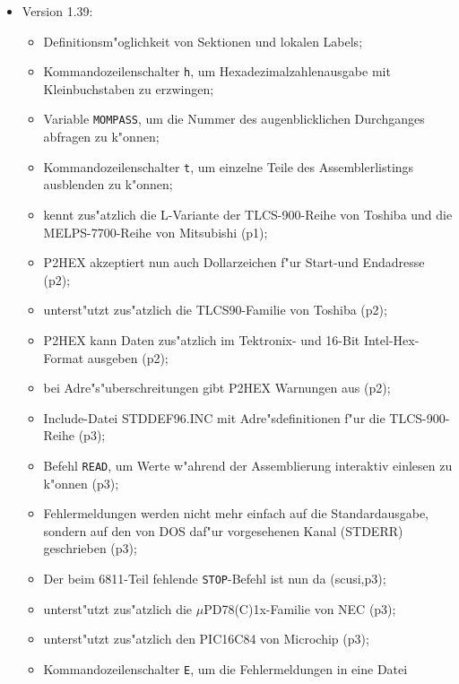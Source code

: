 \documentclass[12pt,a4paper,twoside]{report}
\newcommand{\tty}[1]{{\tt #1}}
\begin{document}
{\begin{itemize}
{\begin{itemize}
      \item{Der 8048-Codegenerator kennt nun auch die 8041/42-
            Befehlserweiterungen(p2);}
      \item{unterst"utzt zus"atzlich die Zilog Z8-Mikrokontroller(p3).}
      \end{itemize}}
\item{Version 1.39:
      \begin{itemize}
      \item{Definitionsm"oglichkeit von Sektionen und lokalen Labels;}
      \item{Kommandozeilenschalter \tty{h}, um Hexadezimalzahlenausgabe mit
            Kleinbuchstaben zu erzwingen;}
      \item{Variable \tty{MOMPASS}, um die Nummer des augenblicklichen Durchganges
            abfragen zu k"onnen;}
      \item{Kommandozeilenschalter \tty{t}, um einzelne Teile des Assemblerlistings
            ausblenden zu k"onnen;}
      \item{kennt zus"atzlich die L-Variante der TLCS-900-Reihe von Toshiba
            und die MELPS-7700-Reihe von Mitsubishi (p1);}
      \item{P2HEX akzeptiert nun auch Dollarzeichen f"ur Start-und Endadresse
            (p2);}
      \item{unterst"utzt zus"atzlich die TLCS90-Familie von Toshiba (p2);}
      \item{P2HEX kann Daten zus"atzlich im Tektronix- und 16-Bit
            Intel-Hex-Format ausgeben (p2);}
      \item{bei Adre"s"uberschreitungen gibt P2HEX Warnungen aus (p2);}
      \item{Include-Datei STDDEF96.INC mit Adre"sdefinitionen f"ur die
            TLCS-900-Reihe (p3);}
      \item{Befehl \tty{READ}, um Werte w"ahrend der Assemblierung interaktiv
            einlesen zu k"onnen (p3);}
      \item{Fehlermeldungen werden nicht mehr einfach auf die
            Standardausgabe, sondern auf den von DOS daf"ur vorgesehenen
            Kanal (STDERR) geschrieben (p3);}
      \item{Der beim 6811-Teil fehlende \tty{STOP}-Befehl ist nun da (scusi,p3);}
      \item{unterst"utzt zus"atzlich die $\mu$PD78(C)1x-Familie von NEC (p3);}
      \item{unterst"utzt zus"atzlich den PIC16C84 von Microchip (p3);}
      \item{Kommandozeilenschalter \tty{E}, um die Fehlermeldungen in eine Datei
}
\end{itemize}}
\end{itemize}}
\end{document}
